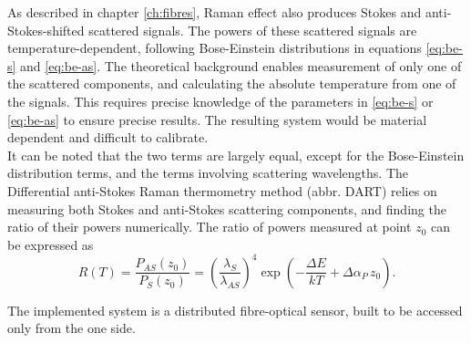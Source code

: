 \documentclass{standalone}
\begin{document}

As described in chapter \ref{ch:fibres}, Raman effect also produces Stokes and anti-Stokes-shifted scattered signals. The powers of these scattered signals are temperature-dependent, following Bose-Einstein distributions in equations \ref{eq:be-s} and \ref{eq:be-as}. The theoretical background enables measurement of only one of the scattered components, and calculating the absolute temperature from one of the signals. This requires precise knowledge of the parameters in \ref{eq:be-s} or \ref{eq:be-as} to ensure precise results. The resulting system would be material dependent and difficult to calibrate. \\

It can be noted that the two terms are largely equal, except for the Bose-Einstein distribution terms, and the terms involving scattering wavelengths. The Differential anti-Stokes Raman thermometry method (abbr. DART) relies on measuring both Stokes and anti-Stokes scattering components, and finding the ratio of their powers numerically. The ratio of powers measured at point $z_0$ can be expressed as
\begin{equation}
R(T) = \frac{P_{AS}(z_0)}{P_S(z_0)} = \left( \frac{\lambda_S}{\lambda_{AS}} \right)^4 \exp\left( - \frac{\varDelta E}{k T} + \varDelta \alpha_P \, z_0 \right) \textrm{.}
\end{equation}





The implemented system is a distributed fibre-optical sensor, built to be accessed only from the one side.



\setcounter{stranica}{\thepage}
\addtocounter{stranica}{1}
\end{document}
